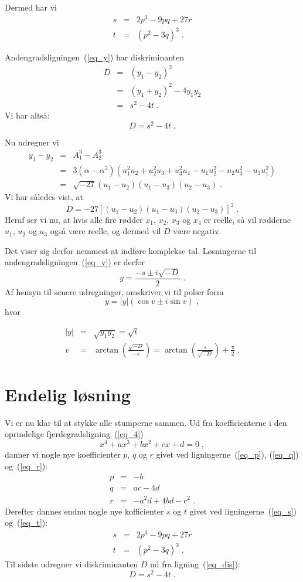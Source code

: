 \documentclass[12pt,oneside,a4paper]{article}
\newcommand{\bas}{\begin{eqnarray*}}
\newcommand{\eas}{\end{eqnarray*}}
\newcommand{\bea}{\begin{eqnarray}}
\newcommand{\eea}{\end{eqnarray}}
\begin{document}
Dermed har vi
\bea
s &=& 2p^3 - 9pq + 27r \label{eq_s}\\
t &=& (p^2-3q)^3 \label{eq_t}  \;.
\eea

Andengradsligningen~(\ref{eq_y}) har diskriminanten
\bas
D &=& (y_1-y_2)^2 \\
&=& (y_1+y_2)^2 - 4y_1y_2 \\
&=& s^2 - 4t \;.
\eas
Vi har altså:
\begin{equation}
    D = s^2 - 4t \;.
\label{eq_dis}
\end{equation}

Nu udregner vi
\bas
y_1-y_2 &=& A_1^3 - A_2^3 \\
&=& 3(\alpha-\alpha^2)(u_1^2u_2 + u_2^2u_3 + u_3^2u_1 - u_1u_2^2 - u_2u_3^2 - u_3u_1^2) \\
&=& \sqrt{-27}(u_1-u_2)(u_1-u_3)(u_2-u_3) \;.
\eas
Vi har således vist, at
\begin{equation}
    D = -27[(u_1-u_2)(u_1-u_3)(u_2-u_3)]^2 \;.
    \label{eq_dis3}
\end{equation}
Heraf ser vi nu, at hvis alle fire rødder $x_1$, $x_2$, $x_3$ og $x_4$ er 
reelle, så vil rødderne $u_1$, $u_2$ og $u_3$ også være reelle, og
dermed vil $D$ være negativ.

Det viser sig derfor nemmest at  indføre komplekse tal. Løsningerne til
andengradsligningen~(\ref{eq_y}) er derfor
\begin{equation}
y = \frac{-s \pm i \sqrt{-D}}{2} \;.
\end{equation}
Af hensyn til senere udregninger, omskriver vi til polær form
\[
y = |y| (\cos v \pm i \sin v) \;,
\]
hvor 
\begin{tcolorbox}
\bea
|y| &=& \sqrt{y_1y_2} = \sqrt{t} \label{eq_y_abs}\\
v &=& \arctan\left(\frac{\sqrt{-D}}{-s}\right)
= \arctan\left(\frac{s}{\sqrt{-D}}\right) + \frac{\pi}{2} \;.
\label{eq_v}
\eea
\end{tcolorbox}

\section{Endelig løsning}
Vi er nu klar til at stykke alle stumperne sammen.
Ud fra koefficienterne i den oprindelige fjerdegradsligning~(\ref{eq_4}) 
\[
    x^4 + ax^3 + bx^2 + cx + d = 0\;,
\]
danner vi nogle nye koefficienter $p$, $q$ og $r$ givet ved
ligningerne~(\ref{eq_p}), (\ref{eq_q}) og~(\ref{eq_r}):
\bas
p &=& -b \\
q &=& ac-4d \\
r &=& -a^2d+4bd-c^2 \;.
\eas
Derefter dannes endnu nogle nye kofficienter $s$ og $t$ givet ved
ligningerne~(\ref{eq_s}) og~(\ref{eq_t}):
\bas
s &=& 2p^3 - 9pq + 27r \\
t &=& (p^2-3q)^3 \;.
\eas
Til sidste udregner vi diskriminanten $D$ ud fra ligning~(\ref{eq_dis}):
\[
D = s^2 - 4t \;.
\]
\end{document}
